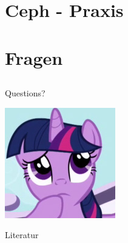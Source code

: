 \documentclass[notes=hide,yellow]{beamer}
\begin{document}
\section{Ceph - Praxis}
\subsection*{}
\begin{frame}

\end{frame}

\section{Fragen}
\subsection*{}
\begin{frame}
	\begin{center}
	\large Questions?
	\end{center}
	
	\begin{center}
	\includegraphics[scale=0.8]{questions.jpg}
	\end{center}
\end{frame}

\begin{frame}{Literatur}
	
		
\end{frame}
\end{document}
